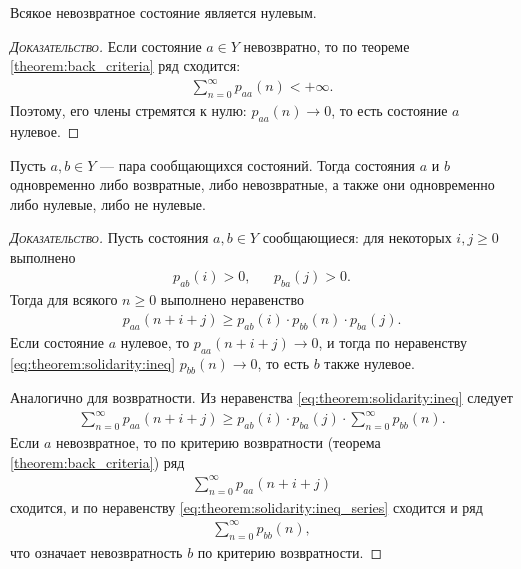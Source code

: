 \documentclass[../main.tex]{subfiles}
\begin{document}
\begin{crly}
 Всякое невозвратное состояние является нулевым.
\end{crly}
\begin{proof}[\normalfont\textsc{Доказательство}]
 Если состояние $ a \in Y $ невозвратно, то по теореме \ref{theorem:back_criteria} ряд сходится:
 \begin{align*}
  \sum_{n=0}^{\infty} p_{aa}(n) < +\infty.
 \end{align*} Поэтому, его члены стремятся к нулю: $ p_{aa}(n) \to 0 $, то есть состояние $ a $ нулевое.
\end{proof}

\begin{thm}
 Пусть $ a, b \in Y $ --- пара сообщающихся состояний. Тогда состояния $ a $ и $ b $ одновременно либо возвратные, либо невозвратные, а также они одновременно либо нулевые, либо не нулевые.
\end{thm}
\begin{proof}[\normalfont\textsc{Доказательство}]
 Пусть состояния $ a, b \in Y $ сообщающиеся: для некоторых $ i,j \geqslant 0 $ выполнено
 \begin{align*}
  p_{ab}(i) > 0, && p_{ba}(j) > 0.
 \end{align*} Тогда для всякого $ n \geqslant 0 $ выполнено неравенство
 \begin{align}
  \label{eq:theorem:solidarity:ineq}
  p_{aa}(n+i+j) \geqslant p_{ab}(i) \cdot p_{bb}(n) \cdot p_{ba}(j).
 \end{align} Если состояние $ a $ нулевое, то $ p_{aa}(n+i+j) \to 0 $, и тогда по неравенству \eqref{eq:theorem:solidarity:ineq} $ p_{bb}(n) \to 0 $, то есть $ b $ также нулевое.

 Аналогично для возвратности. Из неравенства \eqref{eq:theorem:solidarity:ineq} следует
 \begin{align}
  \label{eq:theorem:solidarity:ineq_series}
  \sum_{n=0}^{\infty} p_{aa}(n+i+j) \geqslant p_{ab}(i) \cdot p_{ba}(j) \cdot \sum_{n=0}^{\infty}p_{bb}(n).
 \end{align} Если $ a $ невозвратное, то по критерию возвратности (теорема \ref{theorem:back_criteria}) ряд
 \begin{align*}
  \sum_{n=0}^{\infty} p_{aa}(n+i+j)
 \end{align*} сходится, и по неравенству \eqref{eq:theorem:solidarity:ineq_series} сходится и ряд
 \begin{align*}
  \sum_{n=0}^{\infty}p_{bb}(n),
 \end{align*} что означает невозвратность $ b $ по критерию возвратности.
\end{proof}
\end{document}
